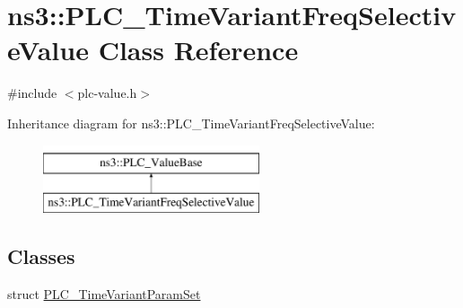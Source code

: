 \hypertarget{classns3_1_1PLC__TimeVariantFreqSelectiveValue}{\section{ns3\-:\-:\-P\-L\-C\-\_\-\-Time\-Variant\-Freq\-Selective\-Value \-Class \-Reference}
\label{classns3_1_1PLC__TimeVariantFreqSelectiveValue}
}


{\ttfamily \#include $<$plc-\/value.\-h$>$}

\-Inheritance diagram for ns3\-:\-:\-P\-L\-C\-\_\-\-Time\-Variant\-Freq\-Selective\-Value\-:\begin{figure}[H]
\begin{center}
\leavevmode
\includegraphics[height=2.000000cm]{classns3_1_1PLC__TimeVariantFreqSelectiveValue}
\end{center}
\end{figure}
\subsection*{\-Classes}
\begin{DoxyCompactItemize}
\item 
struct \hyperlink{structns3_1_1PLC__TimeVariantFreqSelectiveValue_1_1PLC__TimeVariantParamSet}{\-P\-L\-C\-\_\-\-Time\-Variant\-Param\-Set}
\end{DoxyCompactItemize}
